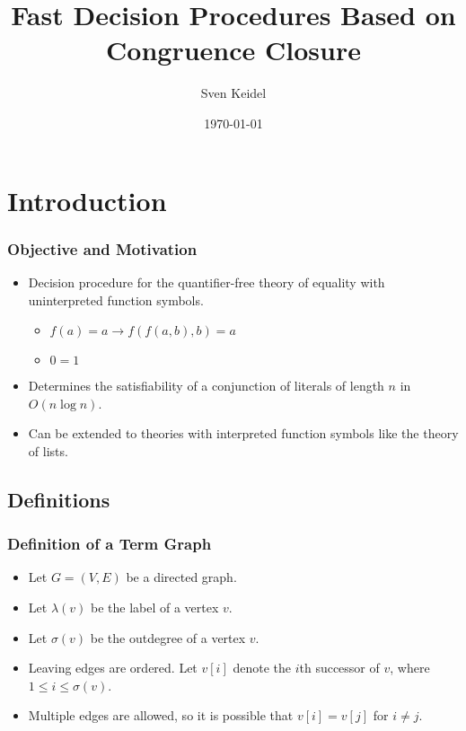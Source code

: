 \documentclass{beamer}
\title{Fast Decision Procedures Based on Congruence Closure}
\author{Sven Keidel}
\date{\today}
\begin{document}
\maketitle

\section{Introduction}

\begin{frame}
  \frametitle{Objective and Motivation}

  \begin{itemize}
    \item Decision procedure for the quantifier-free theory of equality with
      uninterpreted function symbols.
      \begin{itemize}
        \item $f(a) = a \rightarrow f(f(a,b),b) = a$
        \item $0 = 1$
      \end{itemize}

    \item Determines the satisfiability of a conjunction of
      literals of length $n$ in $O(n \log n)$.

    \item Can be extended to theories with interpreted function symbols like the
      theory of lists.
  \end{itemize}

\end{frame}


\subsection{Definitions}

\begin{frame}
  \frametitle{Definition of a Term Graph}

  \begin{Definition}
    \begin{itemize}
      \item Let $G = (V,E)$ be a directed graph.
      \item Let $\lambda(v)$ be the label of a vertex $v$.
      \item Let $\sigma(v)$ be the outdegree of a vertex $v$.
      \item Leaving edges are ordered. Let $v[i]$ denote the $i$th successor of
        $v$, where $1 \leq i \leq \sigma(v)$.
      \item Multiple edges are allowed, so it is possible that $v[i] = v[j]$ for
        $i \neq j$.
    \end{itemize}
  \end{Definition}

\end{frame}
\end{document}
